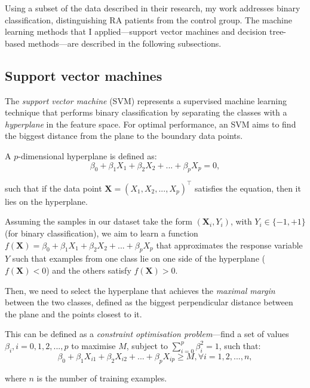 \documentclass[11pt]{article}
\numberwithin{equation}{section}
\begin{document}
Using a subset of the data described in their research, my work addresses binary classification, distinguishing RA patients from the control group. The machine learning methods that I applied---support vector machines and decision tree-based methods---are described in the following subsections.

\subsection{Support vector machines}

The \textit{support vector machine} (SVM) represents a supervised machine learning technique that performs binary classification by separating the classes with a \textit{hyperplane} in the feature space. For optimal performance, an SVM aims to find the biggest distance from the plane to the boundary data points.

A $p$-dimensional hyperplane is defined as:
\begin{equation}
\beta_0 + \beta_1X_1 + \beta_2X_2 + ... + \beta_pX_p = 0,
\end{equation}

such that if the data point $\mathbf{X} = (X_1, X_2, ..., X_p)^\top$ satisfies the equation, then it lies on the hyperplane.

Assuming the samples in our dataset take the form $(\mathbf{X}_i, Y_i)$, with $Y_i \in \{-1, +1\}$ (for binary classification), we aim to learn a function $f(\mathbf{X}) = \beta_0 + \beta_1X_1 + \beta_2X_2 + ... + \beta_pX_p$ that approximates the response variable $Y$ such that examples from one class lie on one side of the hyperplane ($f(\mathbf{X}) < 0$) and the others satisfy $f(\mathbf{X}) > 0$.

Then, we need to select the hyperplane that achieves the \textit{maximal margin} between the two classes, defined as the biggest perpendicular distance between the plane and the points closest to it.

This can be defined as a \textit{constraint optimisation problem}---find a set of values $\beta_i, i = 0, 1, 2, ..., p$ to maximise $M$, subject to $\sum_{i = 0}^{p} \beta_i^2 = 1$, such that:
\begin{equation}
\beta_0 + \beta_1X_{i1} + \beta_2X_{i2} + ... + \beta_pX_{ip} \geq M, \forall i = 1, 2, ..., n,
\end{equation}

where $n$ is the number of training examples.
\end{document}
